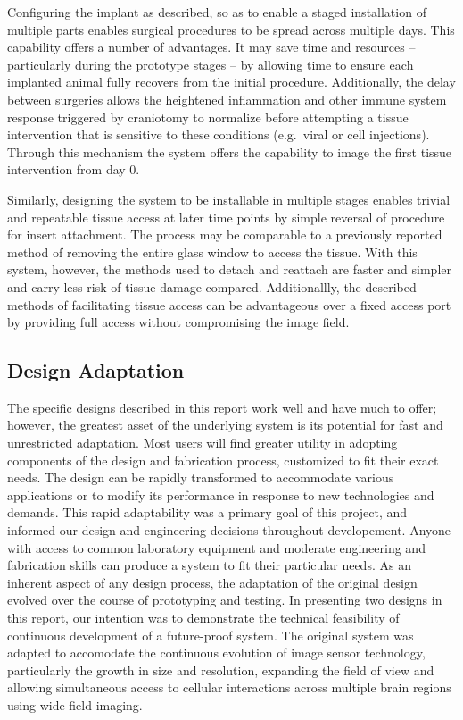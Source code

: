 \documentclass[
  12pt,
]{report}
\numberwithin{figure}{section}
\numberwithin{table}{section}
\numberwithin{equations}{section}
\begin{document}
Configuring the implant as described, so as to enable a staged
installation of multiple parts enables surgical procedures to be spread
across multiple days. This capability offers a number of advantages. It
may save time and resources -- particularly during the prototype stages
-- by allowing time to ensure each implanted animal fully recovers from
the initial procedure. Additionally, the delay between surgeries allows
the heightened inflammation and other immune system response triggered
by craniotomy to normalize before attempting a tissue intervention that
is sensitive to these conditions (e.g.~viral or cell injections).
Through this mechanism the system offers the capability to image the
first tissue intervention from day 0.

Similarly, designing the system to be installable in multiple stages
enables trivial and repeatable tissue access at later time points by
simple reversal of procedure for insert attachment. The process may be
comparable to a previously reported method of removing the entire glass
window to access the tissue. With this system, however, the methods used
to detach and reattach are faster and simpler and carry less risk of
tissue damage compared. Additionallly, the described methods of
facilitating tissue access can be advantageous over a fixed access port
by providing full access without compromising the image field.

\hypertarget{design-adaptation}{%
\subsection{Design Adaptation}\label{design-adaptation}}

The specific designs described in this report work well and have much to
offer; however, the greatest asset of the underlying system is its
potential for fast and unrestricted adaptation. Most users will find
greater utility in adopting components of the design and fabrication
process, customized to fit their exact needs. The design can be rapidly
transformed to accommodate various applications or to modify its
performance in response to new technologies and demands. This rapid
adaptability was a primary goal of this project, and informed our design
and engineering decisions throughout developement. Anyone with access to
common laboratory equipment and moderate engineering and fabrication
skills can produce a system to fit their particular needs. As an
inherent aspect of any design process, the adaptation of the original
design evolved over the course of prototyping and testing. In presenting
two designs in this report, our intention was to demonstrate the
technical feasibility of continuous development of a future-proof
system. The original system was adapted to accomodate the continuous
evolution of image sensor technology, particularly the growth in size
and resolution, expanding the field of view and allowing simultaneous
access to cellular interactions across multiple brain regions using
wide-field imaging.
\end{document}
